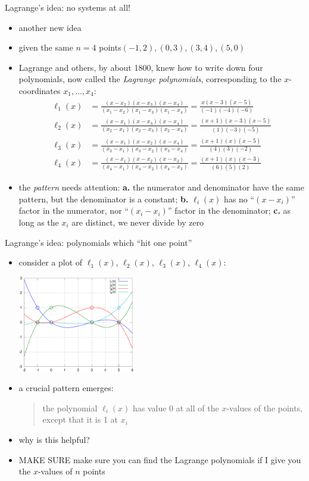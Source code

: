 \documentclass[10pt,hyperref]{beamer}
\newcommand{\MS}{\alert{MAKE SURE}\xspace}
\begin{document}
\begin{frame}{Lagrange's idea: no systems at all!}

\begin{itemize}
\item another new idea
\item given the same $n=4$ points\quad  $(-1,2), (0,3), (3,4), (5,0)$
\item Lagrange and others, by about 1800, knew how to write down four polynomials, now called the \emph{Lagrange polynomials}, corresponding to the $x$-coordinates $x_1,\dots,x_4$:
\small
\begin{align*}
\ell_{1}(x) &= \frac{(x-x_2)(x-x_3)(x-x_4)}{(x_1-x_2)(x_1-x_3)(x_1-x_4)} = \frac{x (x-3) (x-5)}{(-1)(-4)(-6)} \\
\ell_{2}(x) &= \frac{(x-x_1)(x-x_3)(x-x_4)}{(x_2-x_1)(x_2-x_3)(x_2-x_4)} = \frac{(x+1) (x-3) (x-5)}{(1)(-3)(-5)} \\
\ell_{3}(x) &= \frac{(x-x_1)(x-x_2)(x-x_4)}{(x_3-x_1)(x_3-x_2)(x_3-x_4)} = \frac{(x+1) (x) (x-5)}{(4)(3)(-2)} \\
\ell_{4}(x) &= \frac{(x-x_1)(x-x_2)(x-x_3)}{(x_4-x_1)(x_4-x_2)(x_4-x_3)} = \frac{(x+1) (x) (x-3)}{(6)(5)(2)}
\end{align*}
\normalsize
\item the \emph{pattern} needs attention:  \textbf{a.} the numerator and denominator have the same pattern, but the denominator is a constant; \textbf{b.} $\ell_i(x)$ has no ``$(x-x_i)$'' factor in the numerator, nor ``$(x_i-x_i)$'' factor in the denominator;  \textbf{c.} as long as the $x_i$ are distinct, we never divide by zero
\end{itemize}
\end{frame}


\begin{frame}{Lagrange's idea: polynomials which ``hit one point''}

\begin{itemize}
\item consider a plot of $\ell_1(x)$, $\ell_2(x)$, $\ell_3(x)$, $\ell_4(x)$:
  \begin{center}
  \includegraphics[width=0.4\textwidth]{lagrange4}
  \end{center}
\item a crucial pattern emerges:
\begin{quote}
the polynomial $\ell_i(x)$ has value 0 at all of the $x$-values of the points, except that it is 1 at $x_i$
\end{quote}
\item why is this helpful?
\item \MS make sure you can find the Lagrange polynomials if I give you the $x$-values of $n$ points
\end{itemize}
\end{frame}
\end{document}
